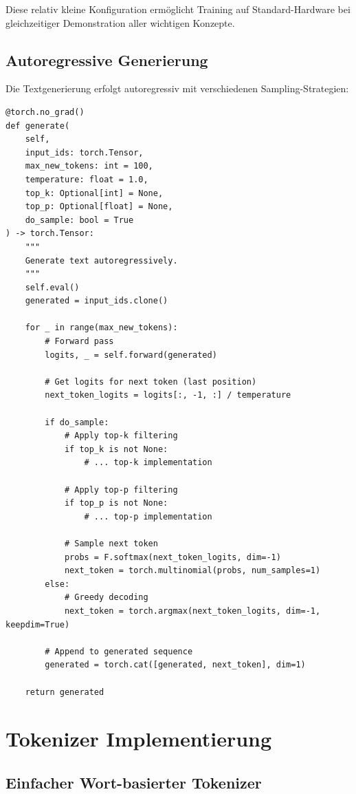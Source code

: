 Diese relativ kleine Konfiguration ermöglicht Training auf Standard-Hardware bei gleichzeitiger Demonstration aller wichtigen Konzepte.

\subsection{Autoregressive Generierung}

Die Textgenerierung erfolgt autoregressiv mit verschiedenen Sampling-Strategien:

\begin{lstlisting}[style=pythonstyle, caption=Autoregressive Textgenerierung]
@torch.no_grad()
def generate(
    self,
    input_ids: torch.Tensor,
    max_new_tokens: int = 100,
    temperature: float = 1.0,
    top_k: Optional[int] = None,
    top_p: Optional[float] = None,
    do_sample: bool = True
) -> torch.Tensor:
    """
    Generate text autoregressively.
    """
    self.eval()
    generated = input_ids.clone()
    
    for _ in range(max_new_tokens):
        # Forward pass
        logits, _ = self.forward(generated)
        
        # Get logits for next token (last position)
        next_token_logits = logits[:, -1, :] / temperature
        
        if do_sample:
            # Apply top-k filtering
            if top_k is not None:
                # ... top-k implementation
            
            # Apply top-p filtering
            if top_p is not None:
                # ... top-p implementation
            
            # Sample next token
            probs = F.softmax(next_token_logits, dim=-1)
            next_token = torch.multinomial(probs, num_samples=1)
        else:
            # Greedy decoding
            next_token = torch.argmax(next_token_logits, dim=-1, keepdim=True)
        
        # Append to generated sequence
        generated = torch.cat([generated, next_token], dim=1)
    
    return generated
\end{lstlisting}

\section{Tokenizer Implementierung}

\subsection{Einfacher Wort-basierter Tokenizer}

